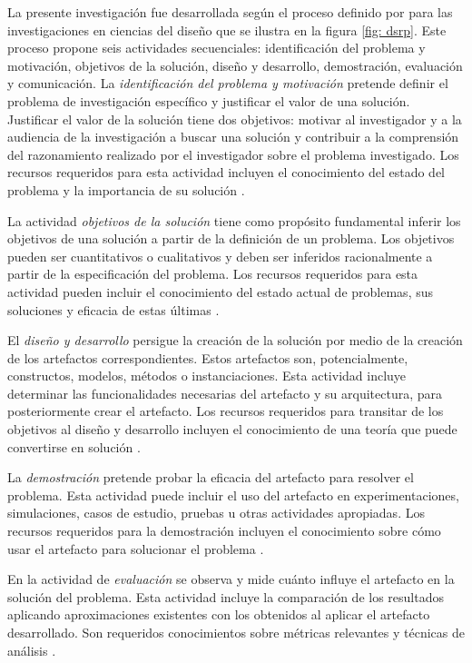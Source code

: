 La presente investigación fue desarrollada según el proceso definido por \cite{Peffers2006} para las investigaciones en ciencias del diseño que se ilustra en la figura \ref{fig: dsrp}. Este proceso propone seis actividades secuenciales: identificación del problema y motivación, objetivos de la solución, diseño y desarrollo, demostración, evaluación y comunicación. La \textit{identificación del problema y motivación} pretende definir el problema de investigación específico y justificar el valor de una solución. Justificar el valor de la solución tiene dos objetivos: motivar al investigador y a la audiencia de la investigación a buscar una solución y contribuir a la comprensión del razonamiento realizado por el investigador sobre el problema investigado. Los recursos requeridos para esta actividad incluyen el conocimiento del estado del problema y la importancia de su solución \citep{Peffers2006}.

La actividad \textit{objetivos de la solución} tiene como propósito fundamental inferir los objetivos de una solución a partir de la definición de un problema. Los objetivos pueden ser cuantitativos o cualitativos y deben ser inferidos racionalmente a partir de la especificación del problema. Los recursos requeridos para esta actividad pueden incluir el conocimiento del estado actual de problemas, sus soluciones y eficacia de estas últimas \citep{Peffers2006}.

El \textit{diseño y desarrollo} persigue la creación de la solución por medio de la creación de los artefactos correspondientes. Estos artefactos son, potencialmente, constructos, modelos, métodos o instanciaciones. Esta actividad incluye determinar las funcionalidades necesarias del artefacto y su arquitectura, para posteriormente crear el artefacto. Los recursos requeridos para transitar de los objetivos al diseño y desarrollo incluyen el conocimiento de una teoría que puede convertirse en solución \citep{Peffers2006}.

La \textit{demostración} pretende probar la eficacia del artefacto para resolver el problema. Esta actividad puede incluir el uso del artefacto en experimentaciones, simulaciones, casos de estudio, pruebas u otras actividades apropiadas. Los recursos requeridos para la demostración incluyen el conocimiento sobre cómo usar el artefacto para solucionar el problema \citep{Peffers2006}.

En la actividad de \textit{evaluación} se observa y mide cuánto influye el artefacto en la solución del problema. Esta actividad incluye la comparación de los resultados aplicando aproximaciones existentes con los obtenidos al aplicar el artefacto desarrollado. Son requeridos conocimientos sobre métricas relevantes y técnicas de análisis \citep{Peffers2006}.

